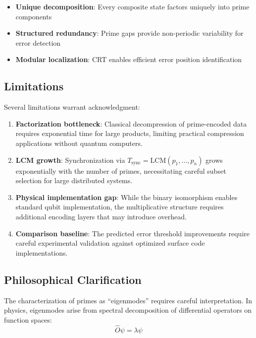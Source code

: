 \documentclass[12pt,a4paper]{article}
\begin{document}
\begin{itemize}
    \item \textbf{Unique decomposition}: Every composite state factors uniquely into prime components
    \item \textbf{Structured redundancy}: Prime gaps provide non-periodic variability for error detection
    \item \textbf{Modular localization}: CRT enables efficient error position identification
\end{itemize}

\subsection{Limitations}

Several limitations warrant acknowledgment:

\begin{enumerate}
    \item \textbf{Factorization bottleneck}: Classical decompression of prime-encoded data requires exponential time for large products, limiting practical compression applications without quantum computers.

    \item \textbf{LCM growth}: Synchronization via $T_{\text{sync}} = \text{LCM}(p_1, \ldots, p_n)$ grows exponentially with the number of primes, necessitating careful subset selection for large distributed systems.

    \item \textbf{Physical implementation gap}: While the binary isomorphism enables standard qubit implementation, the multiplicative structure requires additional encoding layers that may introduce overhead.

    \item \textbf{Comparison baseline}: The predicted error threshold improvements require careful experimental validation against optimized surface code implementations.
\end{enumerate}

\subsection{Philosophical Clarification}

The characterization of primes as ``eigenmodes'' requires careful interpretation. In physics, eigenmodes arise from spectral decomposition of differential operators on function spaces:
\begin{equation}
    \hat{O}\psi = \lambda\psi
\end{equation}
\end{document}
